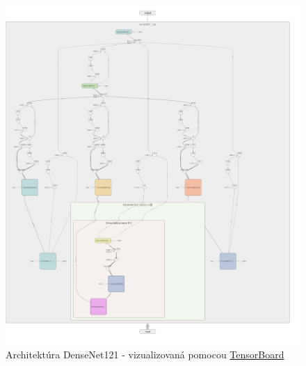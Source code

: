 \documentclass[a4paper, 11pt]{article}
\begin{document}
\begin{figure}
    \centering
    \includegraphics[width=1\linewidth]{images/png (5).png}
    \caption{Architektúra DenseNet121 - vizualizovaná pomocou \href{https://pytorch.org/tutorials/intermediate/tensorboard_tutorial.html}{TensorBoard}}
    \label{fig:enter-label}
\end{figure}
\end{document}
